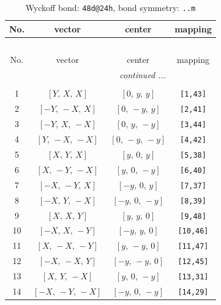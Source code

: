\documentclass[fleqn,8pt]{jsarticle}
\begin{document}
\begin{longtable}{cccc}
\caption{Wyckoff bond: {\tt 48d@24h}, bond symmetry: {\tt ..m}}
 \\
 \hline \hline
No. & vector & center & mapping \\ \hline \endfirsthead

\multicolumn{3}{l}{\tablename\ \thetable{}} \\
 \hline \hline
No. & vector & center & mapping \\ \hline \endhead

 \hline \hline
\multicolumn{3}{r}{\footnotesize\it continued ...} \\ \endfoot

 \hline \hline
\multicolumn{3}{r}{} \\ \endlastfoot

1 & $\left[ Y,\, X,\, X \right]$ & $\left[ 0,\, y,\, y \right]$ & {\tt [1,43]} \\ \hline
2 & $\left[ - Y,\, - X,\, X \right]$ & $\left[ 0,\, - y,\, y \right]$ & {\tt [2,41]} \\ \hline
3 & $\left[ - Y,\, X,\, - X \right]$ & $\left[ 0,\, y,\, - y \right]$ & {\tt [3,44]} \\ \hline
4 & $\left[ Y,\, - X,\, - X \right]$ & $\left[ 0,\, - y,\, - y \right]$ & {\tt [4,42]} \\ \hline
5 & $\left[ X,\, Y,\, X \right]$ & $\left[ y,\, 0,\, y \right]$ & {\tt [5,38]} \\ \hline
6 & $\left[ X,\, - Y,\, - X \right]$ & $\left[ y,\, 0,\, - y \right]$ & {\tt [6,40]} \\ \hline
7 & $\left[ - X,\, - Y,\, X \right]$ & $\left[ - y,\, 0,\, y \right]$ & {\tt [7,37]} \\ \hline
8 & $\left[ - X,\, Y,\, - X \right]$ & $\left[ - y,\, 0,\, - y \right]$ & {\tt [8,39]} \\ \hline
9 & $\left[ X,\, X,\, Y \right]$ & $\left[ y,\, y,\, 0 \right]$ & {\tt [9,48]} \\ \hline
10 & $\left[ - X,\, X,\, - Y \right]$ & $\left[ - y,\, y,\, 0 \right]$ & {\tt [10,46]} \\ \hline
11 & $\left[ X,\, - X,\, - Y \right]$ & $\left[ y,\, - y,\, 0 \right]$ & {\tt [11,47]} \\ \hline
12 & $\left[ - X,\, - X,\, Y \right]$ & $\left[ - y,\, - y,\, 0 \right]$ & {\tt [12,45]} \\ \hline
13 & $\left[ X,\, Y,\, - X \right]$ & $\left[ y,\, 0,\, - y \right]$ & {\tt [13,31]} \\ \hline
14 & $\left[ - X,\, - Y,\, - X \right]$ & $\left[ - y,\, 0,\, - y \right]$ & {\tt [14,29]} \\ \hline

\end{longtable}
\end{document}

